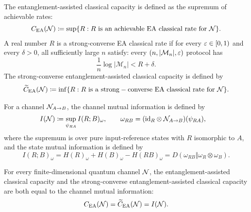 \documentclass[10pt,a4paper]{article}
\begin{document}
\begin{definition}
    \label{def:ea-capacities}
    The entanglement-assisted classical capacity is defined as the supremum of
    achievable rates:
    \begin{equation}
        C_{\operatorname{EA}}(\cN)
        \coloneqq
        \sup\{R:R\ \mathrm{is~an~achievable~EA~classical~rate~for~}\cN\}.
    \end{equation}
    A real number $R$ is a strong-converse EA classical rate if for every
    $\varepsilon\in[0,1)$ and every $\delta>0$, all sufficiently large $n$ satisfy:
    every $(n,|\mathcal M_n|,\varepsilon)$ protocol has
    \begin{equation}
        \frac{1}{n}\log|\mathcal M_n| < R+\delta .
    \end{equation}
    The strong-converse entanglement-assisted classical capacity is defined by
    \begin{equation}
        \widetilde C_{\operatorname{EA}}(\cN)
        \coloneqq
        \inf\{R:R\ \mathrm{is~a~strong-converse~EA~classical~rate~for~}\cN\}.
    \end{equation}
\end{definition}
	
\begin{definition}
    \label{def:ea-channel-mutual-information}
    For a channel ${\cal N}_{A\to B}$, the channel mutual information is defined by
    \begin{equation}
        \begin{aligned}
            I({\cal N})
            &\coloneqq
            \sup_{\psi_{RA}} I(R;B)_{\omega},
            \qquad
            \omega_{RB}=({\operatorname{id}}_R\otimes {\cal N}_{A\to B})(\psi_{RA}),
        \end{aligned}
    \end{equation}
    where the supremum is over pure input-reference states with $R$ isomorphic to $A$, and the state mutual information is defined by
    \begin{equation}
        I(R;B)_\omega=H(R)_\omega+H(B)_\omega-H(RB)_\omega=D(\omega_{RB}\Vert \omega_R\otimes\omega_B).
    \end{equation}
\end{definition}

\begin{theorem}
    \label{thm:ea-capacity-kw}
    For every finite-dimensional quantum channel ${\cal N}$, the entanglement-assisted
    classical capacity and the strong-converse entanglement-assisted classical
    capacity are both equal to the channel mutual information:
    \begin{equation}
        C_{\operatorname{EA}}({\cal N})
        =
        \widetilde C_{\operatorname{EA}}({\cal N})
        =
        I({\cal N}).
    \end{equation}
\end{theorem}
	
\end{document}
